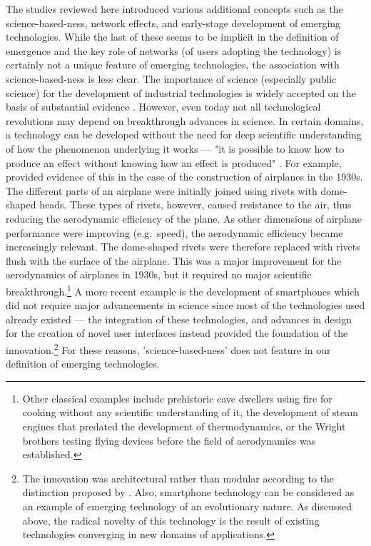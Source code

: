 \documentclass[11pt]{article}
\begin{document}
The studies reviewed here introduced various additional concepts such as the science-based-ness, network effects, and early-stage development of emerging technologies. While the last of these seems to be implicit in the definition of emergence and the key role of networks (of users adopting the technology) is certainly not a unique feature of emerging technologies, the association with science-based-ness is less clear. The importance of science (especially public science) for the development of industrial technologies is widely accepted on the basis of substantial evidence \citep[e.g.][]{Narin1997}. However, even today not all technological revolutions may depend on breakthrough advances in science. In certain domains, a technology can be developed without the need for deep scientific understanding of how the phenomenon underlying it works --- "it is possible to know how to produce an effect without knowing how an effect is produced" \citep[p. 4]{Nightingale2014}. For example, \cite{Vincenti1984} provided evidence of this in the case of the construction of airplanes in the 1930s. The different parts of an airplane were initially joined using rivets with dome-shaped heads. These types of rivets, however, caused resistance to the air, thus reducing the aerodynamic efficiency of the plane. As other dimensions of airplane performance were improving (e.g.\ speed), the aerodynamic efficiency became increasingly relevant. The dome-shaped rivets were therefore replaced with rivets flush with the surface of the airplane. This was a major improvement for the aerodynamics of airplanes in 1930s, but it required no major scientific breakthrough.\footnote{Other classical examples include prehistoric cave dwellers using fire for cooking without any scientific understanding of it, the development of steam engines that predated the development of thermodynamics, or the Wright brothers testing flying devices before the field of aerodynamics was established.} A more recent example is the development of smartphones which did not require major advancements in science since most of the technologies used already existed --- the integration of these technologies, and advances in design for the creation of novel user interfaces instead provided the foundation of the innovation.\footnote{The innovation was architectural rather than modular according to the distinction proposed by \cite{Henderson1990}. Also, smartphone technology can be considered as an example of emerging technology of an evolutionary nature. As discussed above, the radical novelty of this technology is the result of existing technologies converging in new domains of applications.} For these reasons, 'science-based-ness' does not feature in our definition of emerging technologies.
\end{document}
